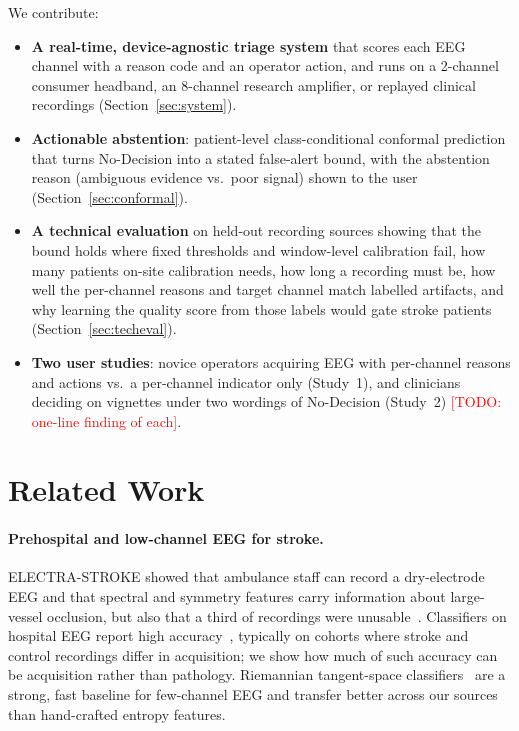 \documentclass[sigconf,review,anonymous]{acmart}
\newcommand{\TODO}[1]{\textcolor{red}{[TODO: #1]}}
\begin{document}
We contribute:
\begin{itemize}
  \item \textbf{A real-time, device-agnostic triage system} that scores each EEG channel with a reason code and an operator action, and runs on a 2-channel consumer headband, an 8-channel research amplifier, or replayed clinical recordings (Section~\ref{sec:system}).
  \item \textbf{Actionable abstention}: patient-level class-conditional conformal prediction that turns No-Decision into a stated false-alert bound, with the abstention reason (ambiguous evidence vs.\ poor signal) shown to the user (Section~\ref{sec:conformal}).
  \item \textbf{A technical evaluation} on held-out recording sources showing that the bound holds where fixed thresholds and window-level calibration fail, how many patients on-site calibration needs, how long a recording must be, how well the per-channel reasons and target channel match labelled artifacts, and why learning the quality score from those labels would gate stroke patients (Section~\ref{sec:techeval}).
  \item \textbf{Two user studies}: novice operators acquiring EEG with per-channel reasons and actions vs.\ a per-channel indicator only (Study~1), and clinicians deciding on vignettes under two wordings of No-Decision (Study~2) \TODO{one-line finding of each}.
\end{itemize}

\section{Related Work}

\paragraph{Prehospital and low-channel EEG for stroke.}
ELECTRA-STROKE showed that ambulance staff can record a dry-electrode EEG and that spectral and symmetry features carry information about large-vessel occlusion, but also that a third of recordings were unusable~\cite{vanstigt2023electra}.
Classifiers on hospital EEG report high accuracy~\cite{tong2025}, typically on cohorts where stroke and control recordings differ in acquisition; we show how much of such accuracy can be acquisition rather than pathology.
Riemannian tangent-space classifiers~\cite{barachant2012} are a strong, fast baseline for few-channel EEG and transfer better across our sources than hand-crafted entropy features.
\end{document}
